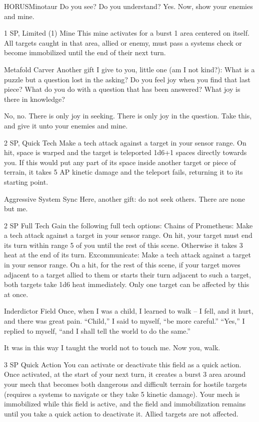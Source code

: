 \begin{mech}{HORUS}{Minotaur}
Do you see? Do you understand? Yes. Now, show your enemies and mine.

1 SP, Limited (1)
Mine
This mine activates for a burst 1 area centered on itself. All targets caught in that area, allied or enemy, must pass a systems check or become immobilized until the end of their next turn.

Metafold Carver
Another gift I give to you, little one (am I not kind?): What is a puzzle but a question lost in the asking? Do you feel joy when you find that last piece? What do you do with a question that has been answered? What joy is there in knowledge?

No, no. There is only joy in seeking. There is only joy in the question. Take this, and give it unto your enemies and mine.

2 SP, Quick Tech
Make a tech attack against a target in your sensor range. On hit, space is warped and the target is teleported 1d6+1 spaces directly towards you. If this would put any part of its space inside another target or piece of terrain, it takes 5 AP kinetic damage and the teleport fails, returning it to its starting point.

Aggressive System Sync
Here, another gift: do not seek others. There are none but me.

2 SP
Full Tech
Gain the following full tech options:
Chains of Prometheus: Make a tech attack against a target in your sensor range. On hit, your target must end its turn within range 5 of you until the rest of this scene. Otherwise it takes 3 heat at the end of its turn.
Excommunicate: Make a tech attack against a target in your sensor range. On a hit, for the rest of this scene, if your target moves adjacent to a target allied to them or starts their turn adjacent to such a target, both targets take 1d6 heat immediately. Only one target can be affected by this at once.

Inderdictor Field
Once, when I was a child, I learned to walk  -- I fell, and it hurt, and there was great pain. “Child,” I said to myself, “be more careful.” “Yes,” I replied to myself, “and I shall tell the world to do the same.”

It was in this way I taught the world not to touch me. Now you, walk.

3 SP
Quick Action
You can activate or deactivate this field as a quick action. Once activated, at the start of your next turn, it creates a burst 3 area around your mech that becomes both dangerous and difficult terrain for hostile targets (requires a systems to navigate or they take 5 kinetic damage). Your mech is immobilized while this field is active, and the field and immobilization remains until you take a quick action to deactivate it. Allied targets are not affected.


\end{mech}
